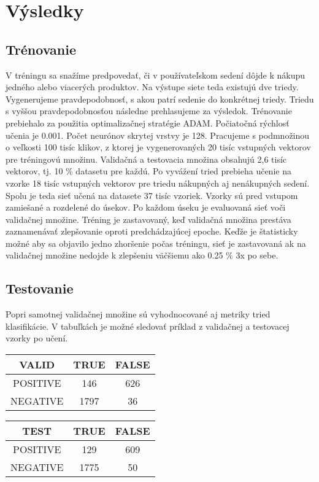 \newpage

\chapter{Výsledky}

\section{Trénovanie}

V tréningu sa snažíme predpovedať, či v používateľskom sedení dôjde k nákupu jedného alebo viacerých produktov. Na výstupe siete teda existujú dve triedy. Vygenerujeme pravdepodobnosť, s akou patrí sedenie do konkrétnej triedy. Triedu s vyššou pravdepodobnosťou následne prehlasujeme za výsledok. \newline
Trénovanie prebiehalo za použitia optimalizačnej stratégie ADAM. Počiatočná rýchlosť učenia je 0.001. Počet neurónov skrytej vrstvy je 128.\newline
Pracujeme s podmnožinou o veľkosti 100 tisíc klikov, z ktorej je vygenerovaných 20 tisíc vstupných vektorov pre tréningovú množinu. Validačná a testovacia množina obsahujú 2,6 tisíc vektorov, tj. 10 \% datasetu pre každú. Po vyvážení tried prebieha učenie na vzorke 18 tisíc vstupných vektorov pre triedu nákupných aj nenákupných sedení. Spolu je teda sieť učená na datasete 37 tisíc vzoriek. Vzorky sú pred vstupom zamiešané a rozdelené do úsekov. Po každom úseku je evaluovaná sieť voči validačnej množine.\newline
Tréning je zastavovaný, keď validačná množina prestáva zaznamenávať zlepšovanie oproti predchádzajúcej epoche. Keďže je štatisticky možné aby sa objavilo jedno zhoršenie počas tréningu, sieť je zastavovaná ak na validačnej množine nedojde k zlepšeniu väčšiemu ako 0.25 \% 3x po sebe. 

\section{Testovanie}
\label{testing}

Popri samotnej validačnej množine sú vyhodnocované aj metriky tried klasifikácie. V tabuľkách je možné sledovať príklad z validačnej a testovacej vzorky po učení.

\parbox{.45\linewidth}{
\begin{tabular}{||c||c|c|} 
	\hline
	VALID & TRUE & FALSE \\ [0.5ex] 
	\hline\hline
	POSITIVE & 146 &  626 \\ 
	\hline
	NEGATIVE & 1797 & 36 \\
	\hline
\end{tabular}
}
\parbox{.45\linewidth}{
\begin{tabular}{||c||c|c|} 
	\hline
	TEST & TRUE & FALSE \\ [0.5ex] 
	\hline\hline
	POSITIVE & 129 &  609 \\ 
	\hline
	NEGATIVE & 1775 & 50 \\
	\hline
\end{tabular}
}
\newline

